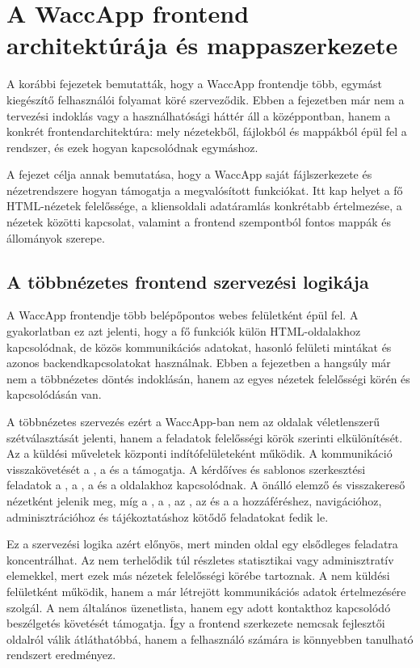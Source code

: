 \chapter{A WaccApp frontend architektúrája és mappaszerkezete}

A korábbi fejezetek bemutatták, hogy a WaccApp frontendje több, egymást kiegészítő felhasználói folyamat köré szerveződik. Ebben a fejezetben már nem a tervezési indoklás vagy a használhatósági háttér áll a középpontban, hanem a konkrét frontendarchitektúra: mely nézetekből, fájlokból és mappákból épül fel a rendszer, és ezek hogyan kapcsolódnak egymáshoz.

A fejezet célja annak bemutatása, hogy a WaccApp saját fájlszerkezete és nézetrendszere hogyan támogatja a megvalósított funkciókat. Itt kap helyet a fő HTML-nézetek felelőssége, a kliensoldali adatáramlás konkrétabb értelmezése, a nézetek közötti kapcsolat, valamint a frontend szempontból fontos mappák és állományok szerepe.

\section{A többnézetes frontend szervezési logikája}

A WaccApp frontendje több belépőpontos webes felületként épül fel. A gyakorlatban ez azt jelenti, hogy a fő funkciók külön HTML-oldalakhoz kapcsolódnak, de közös kommunikációs adatokat, hasonló felületi mintákat és azonos backendkapcsolatokat használnak. Ebben a fejezetben a hangsúly már nem a többnézetes döntés indoklásán, hanem az egyes nézetek felelősségi körén és kapcsolódásán van.

A többnézetes szervezés ezért a WaccApp-ban nem az oldalak véletlenszerű szétválasztását jelenti, hanem a feladatok felelősségi körök szerinti elkülönítését. Az  a küldési műveletek központi indítófelületeként működik. A kommunikáció visszakövetését a , a  és a  támogatja. A kérdőíves és sablonos szerkesztési feladatok a , a , a  és a  oldalakhoz kapcsolódnak. A  önálló elemző és visszakereső nézetként jelenik meg, míg a , a , az , az  és a  a hozzáféréshez, navigációhoz, adminisztrációhoz és tájékoztatáshoz kötődő feladatokat fedik le. 

Ez a szervezési logika azért előnyös, mert minden oldal egy elsődleges feladatra koncentrálhat. Az  nem terhelődik túl részletes statisztikai vagy adminisztratív elemekkel, mert ezek más nézetek felelősségi körébe tartoznak. A  nem küldési felületként működik, hanem a már létrejött kommunikációs adatok értelmezésére szolgál. A  nem általános üzenetlista, hanem egy adott kontakthoz kapcsolódó beszélgetés követését támogatja. Így a frontend szerkezete nemcsak fejlesztői oldalról válik átláthatóbbá, hanem a felhasználó számára is könnyebben tanulható rendszert eredményez. 

